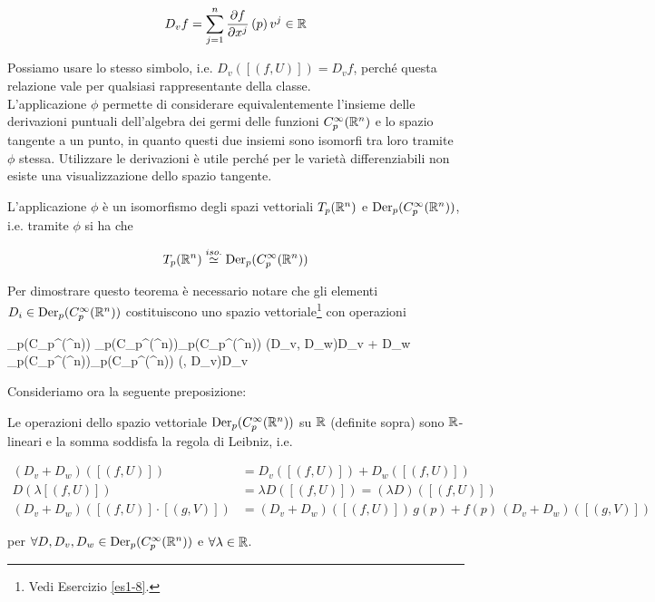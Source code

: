 \begin{align}
	D_{v} f = \sum_{j=1}^{n} \pdv{f}{x^{j}} \, (p) \, v^{j} \in \mathbb{R}
\end{align}

Possiamo usare lo stesso simbolo, i.e. $ D_{v} ([(f,U)]) = D_{v} f $, perché questa relazione vale per qualsiasi rappresentante della classe.\\
L'applicazione $ \phi $ permette di considerare equivalentemente l'insieme delle derivazioni puntuali dell'algebra dei germi delle funzioni $ C_{p}^{\infty}(\mathbb{R}^{n}) $ e lo spazio tangente a un punto, in quanto questi due insiemi sono isomorfi tra loro tramite $ \phi $ stessa. Utilizzare le derivazioni è utile perché per le varietà differenziabili non esiste una visualizzazione dello spazio tangente.

\begin{theorem}
	L'applicazione $ \phi $ è un isomorfismo degli spazi vettoriali $ T_{p}(\mathbb{R}^{n}) $ e $ \operatorname{Der}_{p}(C_{p}^{\infty}(\mathbb{R}^{n})) $, i.e. tramite $ \phi $ si ha che
	
	\begin{equation}
		T_{p}(\mathbb{R}^{n}) \stackrel{iso.}{\simeq} \operatorname{Der}_{p}(C_{p}^{\infty}(\mathbb{R}^{n}))
	\end{equation}
\end{theorem}

Per dimostrare questo teorema è necessario notare che gli elementi $ D_{i} \in \operatorname{Der}_{p}(C_{p}^{\infty}(\mathbb{R}^{n})) $ costituiscono uno spazio vettoriale\footnote{%
	Vedi Esercizio \ref{es1-8}.%
} con operazioni

\map{+}
	{\der_{p}(C_{p}^{\infty}(\R^{n})) \times \der_{p}(C_{p}^{\infty}(\R^{n}))}{\der_{p}(C_{p}^{\infty}(\R^{n}))}
	{(D_{v}, D_{w})}{D_{v} + D_{w}}
\map{\cdot}
	{\R \times \der_{p}(C_{p}^{\infty}(\R^{n}))}{\der_{p}(C_{p}^{\infty}(\R^{n}))}
	{(\lambda, D_{v})}{\lambda D_{v}}

Consideriamo ora la seguente preposizione:

\begin{definition}
	Le operazioni dello spazio vettoriale $ \operatorname{Der}_{p}(C_{p}^{\infty}(\mathbb{R}^{n})) $ su $ \mathbb{R} $ (definite sopra) sono $ \mathbb{R} $-lineari e la somma soddisfa la regola di Leibniz, i.e.
	
	\begin{align}
		(D_{v} + D_{w}) ([(f,U)]) &= D_{v}([(f,U)]) + D_{w}([(f,U)])\\
		D (\lambda [(f,U)]) &= \lambda D ([(f,U)]) = (\lambda D) ([(f,U)])\\
		(D_{v} + D_{w}) ([(f,U)] \cdot [(g,V)]) &= (D_{v} + D_{w}) ([(f,U)]) \, g(p) + f(p) \, (D_{v} + D_{w}) ([(g,V)])
	\end{align}
	
	per $ \forall D, D_{v}, D_{w} \in \operatorname{Der}_{p}(C_{p}^{\infty}(\mathbb{R}^{n})) $ e $ \forall \lambda \in \mathbb{R} $.
\end{definition}

